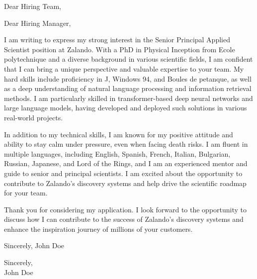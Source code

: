 \documentclass[a4paper,10pt]{letter}
\begin{document}
\begin{letter}{}
\opening{Dear Hiring Team,}

Dear Hiring Manager,

I am writing to express my strong interest in the Senior Principal Applied Scientist position at Zalando. With a PhD in Physical Inception from Ecole polytechnique and a diverse background in various scientific fields, I am confident that I can bring a unique perspective and valuable expertise to your team. My hard skills include proficiency in J, Windows 94, and Boules de petanque, as well as a deep understanding of natural language processing and information retrieval methods. I am particularly skilled in transformer-based deep neural networks and large language models, having developed and deployed such solutions in various real-world projects.

In addition to my technical skills, I am known for my positive attitude and ability to stay calm under pressure, even when facing death risks. I am fluent in multiple languages, including English, Spanish, French, Italian, Bulgarian, Russian, Japanese, and Lord of the Rings, and I am an experienced mentor and guide to senior and principal scientists. I am excited about the opportunity to contribute to Zalando's discovery systems and help drive the scientific roadmap for your team.

Thank you for considering my application. I look forward to the opportunity to discuss how I can contribute to the success of Zalando's discovery systems and enhance the inspiration journey of millions of your customers.

Sincerely,
John Doe

\closing{Sincerely,\\John Doe}

\end{letter}
\end{document}
